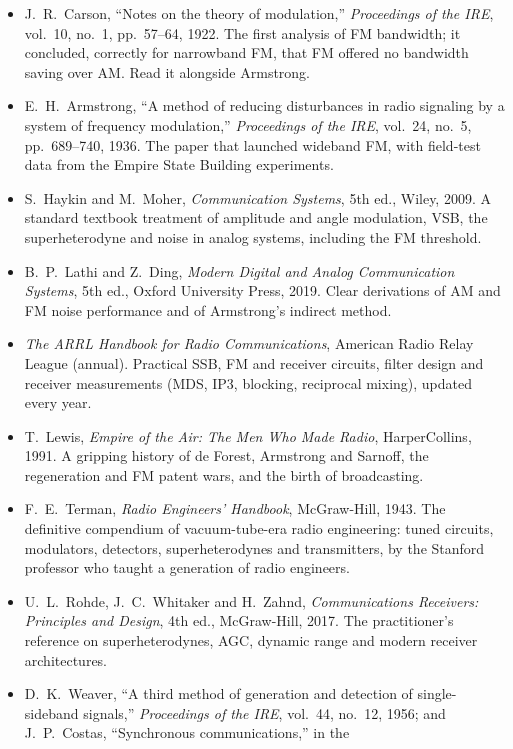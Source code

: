 \furtherreading
\begin{itemize}
\item J.~R.~Carson, ``Notes on the theory of modulation,'' \emph{Proceedings of the IRE}, vol.~10, no.~1,
pp.~57--64, 1922. The first analysis of FM bandwidth; it concluded, correctly for narrowband FM, that FM offered
no bandwidth saving over AM. Read it alongside Armstrong.
\item E.~H.~Armstrong, ``A method of reducing disturbances in radio signaling by a system of frequency
modulation,'' \emph{Proceedings of the IRE}, vol.~24, no.~5, pp.~689--740, 1936. The paper that launched wideband
FM, with field-test data from the Empire State Building experiments.
\item S.~Haykin and M.~Moher, \emph{Communication Systems}, 5th ed., Wiley, 2009. A standard textbook treatment
of amplitude and angle modulation, VSB, the superheterodyne and noise in analog systems, including the FM
threshold.
\item B.~P.~Lathi and Z.~Ding, \emph{Modern Digital and Analog Communication Systems}, 5th ed., Oxford University
Press, 2019. Clear derivations of AM and FM noise performance and of Armstrong's indirect method.
\item \emph{The ARRL Handbook for Radio Communications}, American Radio Relay League (annual). Practical SSB, FM
and receiver circuits, filter design and receiver measurements (MDS, IP3, blocking, reciprocal mixing), updated
every year.
\item T.~Lewis, \emph{Empire of the Air: The Men Who Made Radio}, HarperCollins, 1991. A gripping history of de
Forest, Armstrong and Sarnoff, the regeneration and FM patent wars, and the birth of broadcasting.
\item F.~E.~Terman, \emph{Radio Engineers' Handbook}, McGraw-Hill, 1943. The definitive compendium of
vacuum-tube-era radio engineering: tuned circuits, modulators, detectors, superheterodynes and transmitters, by
the Stanford professor who taught a generation of radio engineers.
\item U.~L.~Rohde, J.~C.~Whitaker and H.~Zahnd, \emph{Communications Receivers: Principles and Design}, 4th ed.,
McGraw-Hill, 2017. The practitioner's reference on superheterodynes, AGC, dynamic range and modern receiver
architectures.
\item D.~K.~Weaver, ``A third method of generation and detection of single-sideband signals,''
\emph{Proceedings of the IRE}, vol.~44, no.~12, 1956; and J.~P.~Costas, ``Synchronous communications,'' in the

\end{itemize}
